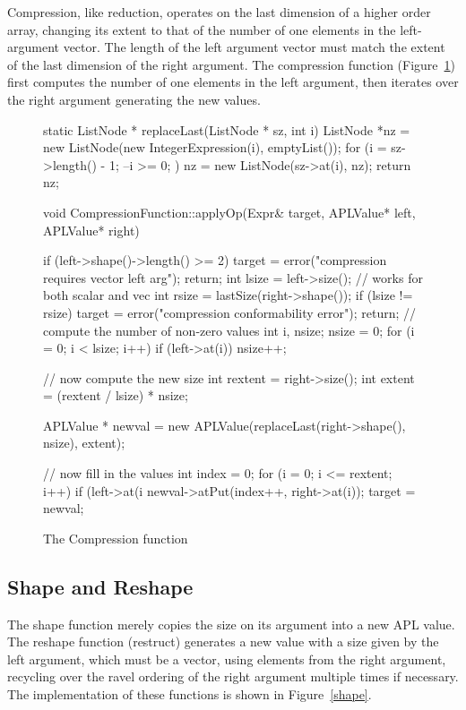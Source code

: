 Compression, like reduction, operates on the last dimension of a higher
order array, changing its extent to that of the number of one elements in
the left-argument vector.  The length of the left argument vector must
match the extent of the last dimension of the right argument.
The compression function (Figure~\ref{compress}) first computes the number
of one elements in the left argument, then iterates over the right argument
generating the new values.

\begin{figure}
\begin{cprog}
static ListNode * replaceLast(ListNode * sz, int i)
{
	ListNode *nz = new ListNode(new IntegerExpression(i), emptyList());
	for (i = sz->length() - 1; --i >= 0; )
		nz = new ListNode(sz->at(i), nz);
	return nz;
}

void CompressionFunction::applyOp(Expr& target, APLValue* left, APLValue* right)
{
	if (left->shape()->length() >= 2) {
		target = error("compression requires vector left arg");
		return;
		}
	int lsize = left->size();	// works for both scalar and vec
	int rsize = lastSize(right->shape());
	if (lsize != rsize) {
		target = error("compression conformability error");
		return;
		}
	// compute the number of non-zero values
	int i, nsize;
	nsize = 0;
	for (i = 0; i < lsize; i++)
		if (left->at(i)) nsize++;
	
	// now compute the new size
	int rextent = right->size();
	int extent = (rextent / lsize) * nsize;

	APLValue * newval = new APLValue(replaceLast(right->shape(), nsize),
				extent);

	// now fill in the values
	int index = 0;
	for (i = 0; i <= rextent; i++)
		if (left->at(i %
			newval->atPut(index++, right->at(i));
	target = newval;
}
\end{cprog}
\caption{The Compression function}\label{compress}
\end{figure}

\subsection{Shape and Reshape}

The {\sf shape} function merely copies the size on its argument into a new
APL value.  The reshape function ({\sf restruct}) generates a new value
with a size given by the left argument, which must be a vector, using
elements from the right argument, recycling over the ravel ordering of the
right argument multiple times if necessary.  The implementation of these
functions is shown in Figure~\ref{shape}.

